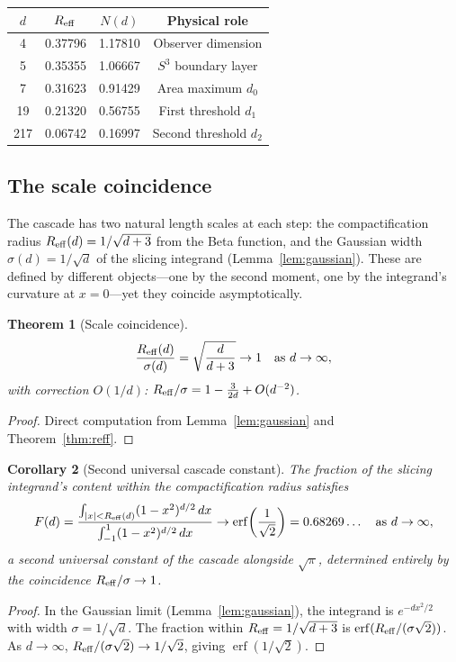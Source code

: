 \documentclass[12pt,a4paper]{article}
\newtheorem{theorem}{Theorem}[section]
\newtheorem{corollary}[theorem]{Corollary}
\begin{document}
\begin{center}
\begin{tabular}{cccc}
\toprule
$d$ & $R_{\rm eff}$ & $N(d)$ & Physical role \\
\midrule
4   & 0.37796 & 1.17810 & Observer dimension \\
5   & 0.35355 & 1.06667 & $S^3$ boundary layer \\
7   & 0.31623 & 0.91429 & Area maximum $d_0$ \\
19  & 0.21320 & 0.56755 & First threshold $d_1$ \\
217 & 0.06742 & 0.16997 & Second threshold $d_2$ \\
\bottomrule
\end{tabular}
\end{center}

\subsection{The scale coincidence}

The cascade has two natural length scales at each step: the compactification radius
$R_{\rm eff}(d) = 1/\sqrt{d+3}$ from the Beta function, and the Gaussian width
$\sigma(d) = 1/\sqrt{d}$ of the slicing integrand (Lemma~\ref{lem:gaussian}). These
are defined by different objects---one by the second moment, one by the integrand's
curvature at $x = 0$---yet they coincide asymptotically.

\begin{theorem}[Scale coincidence]\label{thm:scale}
\[
\frac{R_{\rm eff}(d)}{\sigma(d)} = \sqrt{\frac{d}{d+3}} \to 1 \quad\text{as }
d\to\infty,
\]
with correction $O(1/d)$: $R_{\rm eff}/\sigma = 1 - \frac{3}{2d} + O(d^{-2})$.
\end{theorem}
\begin{proof}
Direct computation from Lemma~\ref{lem:gaussian} and Theorem~\ref{thm:reff}.
\end{proof}

\begin{corollary}[Second universal cascade constant]\label{cor:erf}
The fraction of the slicing integrand's content within the compactification radius
satisfies
\[
F(d) = \frac{\int_{|x|<R_{\rm eff}(d)}(1-x^2)^{d/2}\,dx}
{\int_{-1}^{1}(1-x^2)^{d/2}\,dx}
\to \operatorname{erf}\!\left(\frac{1}{\sqrt{2}}\right) = 0.68269\ldots
\quad\text{as }d\to\infty,
\]
a second universal constant of the cascade alongside $\sqrt{\pi}$, determined entirely
by the coincidence $R_{\rm eff}/\sigma\to 1$.
\end{corollary}
\begin{proof}
In the Gaussian limit (Lemma~\ref{lem:gaussian}), the integrand is
$e^{-dx^2/2}$ with width $\sigma = 1/\sqrt{d}$. The fraction within
$R_{\rm eff} = 1/\sqrt{d+3}$ is
$\operatorname{erf}(R_{\rm eff}/(\sigma\sqrt{2}))$. As $d\to\infty$,
$R_{\rm eff}/(\sigma\sqrt{2})\to 1/\sqrt{2}$, giving
$\operatorname{erf}(1/\sqrt{2})$.
\end{proof}
\end{document}
